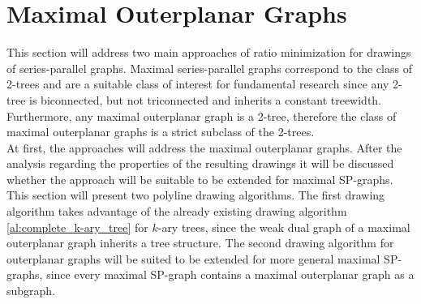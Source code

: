 \section{Maximal Outerplanar Graphs}\label{s:maximal_outerplanar}

This section will address two main approaches of ratio minimization for drawings of series-parallel graphs. Maximal series-parallel graphs correspond to the class of 2-trees \cite[P. 2]{straight-line_2-trees} and are a suitable class of interest for fundamental research since any 2-tree is biconnected, but not triconnected and inherits a constant treewidth. Furthermore, any maximal outerplanar graph is a 2-tree, therefore the class of maximal outerplanar graphs is a strict subclass of the 2-trees.\\
At first, the approaches will address the maximal outerplanar graphs. After the analysis regarding the properties of the resulting drawings it will be discussed whether the approach will be suitable to be extended for maximal SP-graphs. This section will present two polyline drawing algorithms. The first drawing algorithm takes advantage of the already existing drawing algorithm \ref{al:complete_k-ary_tree} for $k$-ary trees, since the weak dual graph of a maximal outerplanar graph inherits a tree structure. The second drawing algorithm for outerplanar graphs will be suited to be extended for more general maximal SP-graphs, since every maximal SP-graph contains a maximal outerplanar graph as a subgraph.

